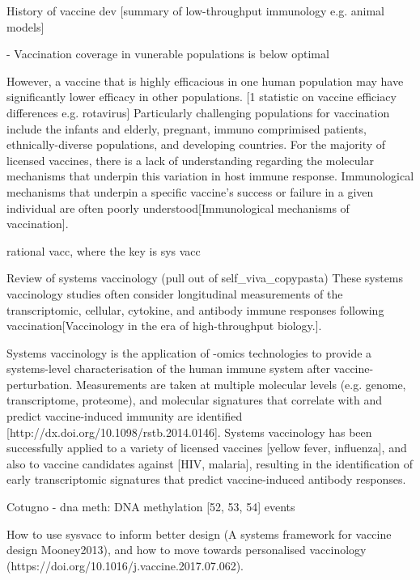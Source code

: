 \begin{outline}
    History of vaccine dev
    [summary of low-throughput immunology e.g. animal models]  

    - Vaccination coverage in vunerable populations is below optimal

    However, a vaccine that is highly efficacious in one human population may have significantly lower efficacy in other populations.
    [1 statistic on vaccine efficiacy differences e.g. rotavirus]
    Particularly challenging populations for vaccination include the infants and elderly, pregnant, immuno comprimised patients, ethnically-diverse populations, and developing countries.
    For the majority of licensed vaccines, there is a lack of understanding regarding the molecular mechanisms that underpin this variation in host immune response.
    Immunological mechanisms that underpin a specific vaccine's success or failure in a given individual are often poorly understood[Immunological mechanisms of vaccination]. 

    rational vacc, where the key is sys vacc

    Review of systems vaccinology (pull out of self\_viva\_copypasta)
    These systems vaccinology studies often consider longitudinal measurements of the transcriptomic, cellular, cytokine, and antibody immune responses following vaccination[Vaccinology in the era of high-throughput biology.].

    Systems vaccinology is the application of -omics technologies to provide a systems-level characterisation of the human immune system after vaccine-perturbation.
    Measurements are taken at multiple molecular levels (e.g. genome, transcriptome, proteome), and molecular signatures that correlate with and predict vaccine-induced immunity are identified [http://dx.doi.org/10.1098/rstb.2014.0146].
    Systems vaccinology has been successfully applied to a variety of licensed vaccines [yellow fever, influenza], and also to vaccine candidates against [HIV, malaria], resulting in the identification of early transcriptomic signatures that predict vaccine-induced antibody responses.


    Cotugno
    - dna meth: DNA methylation [52, 53, 54] events

    How to use sysvacc to inform better design (A systems framework for vaccine design Mooney2013), and how to move towards personalised vaccinology (https://doi.org/10.1016/j.vaccine.2017.07.062).


\end{outline}
